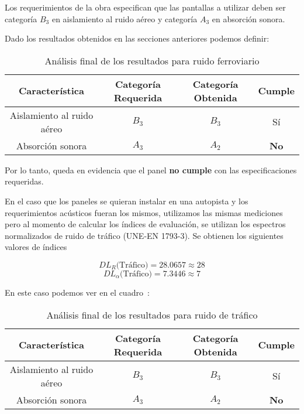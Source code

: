 \par Los requerimientos de la obra especifican que las pantallas a utilizar deben ser categoría $B_3$ en aislamiento al ruido aéreo y categoría $A_3$ en absorción sonora.

Dado los resultados obtenidos en las secciones anteriores podemos definir:

\begin{table}[]
\setlength\arrayrulewidth{1pt}
    \centering
    \begin{tabular}{|c|c|c|c|} \hline
        Característica & Categoría Requerida & Categoría Obtenida & Cumple \\ \hline \hline
        Aislamiento al ruido aéreo & $B_3$ & $B_3$ & Sí \\ \hline
        Absorción sonora & $A_3$ & $A_2$ & \textbf{No} \\ \hline
    \end{tabular}
    \caption{Análisis final de los resultados para ruido ferroviario}
    \label{tab:analisis_final_ferroviario}
\end{table}

\par Por lo tanto, queda en evidencia que el panel \textbf{no cumple} con las especificaciones requeridas.\\

\par En el caso que los paneles se quieran instalar en una autopista y los requerimientos acústicos fueran los mismos, utilizamos las mismas mediciones pero al momento de calcular los índices de evaluación, se utilizan los espectros normalizados de ruido de tráfico (UNE-EN 1793-3). Se obtienen los siguientes valores de índices

\begin{equation}
    \boxed{DL_R\text{(Tráfico)} =28.0657\approx 28}
\end{equation}
\begin{equation}
    \boxed{DL_\alpha \text{(Tráfico)} = 7.3446\approx 7} 
\end{equation}

\par En este caso podemos ver en el cuadro~:

\begin{table}[]
\setlength\arrayrulewidth{1pt}
    \centering
    \begin{tabular}{|c|c|c|c|} \hline
        Característica & Categoría Requerida & Categoría Obtenida & Cumple \\ \hline \hline
        Aislamiento al ruido aéreo & $B_3$ & $B_3$ & Sí \\ \hline
        Absorción sonora & $A_3$ & $A_2$ & \textbf{No} \\ \hline
    \end{tabular}
    \caption{Análisis final de los resultados para ruido de tráfico}
    \label{tab:analisis_final_trafico}
\end{table}

